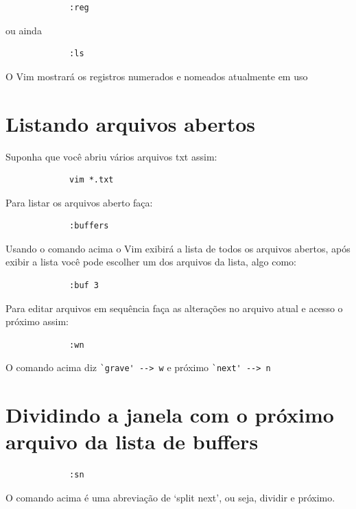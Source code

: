 \documentclass[10pt,a4paper,openany]{book}
\begin{document}
\begin{verbatim}
			 :reg
\end{verbatim}

ou ainda

\begin{verbatim}
			 :ls
\end{verbatim}

O Vim mostrará os registros numerados e nomeados atualmente em uso

\section{Listando arquivos abertos}
\label{Listando arquivos abertos}
Suponha que você abriu vários arquivos txt assim:

\begin{verbatim}
			 vim *.txt
\end{verbatim}

Para listar os arquivos aberto faça:

\begin{verbatim}
			 :buffers
\end{verbatim}

Usando o comando acima o Vim exibirá a lista de todos os arquivos
abertos, após exibir a lista você pode escolher um dos arquivos da
lista, algo como:

\begin{verbatim}
			 :buf 3
\end{verbatim}

Para editar arquivos em sequência faça as alterações no arquivo atual
e acesso o próximo assim:

\begin{verbatim}
			 :wn
\end{verbatim}

O comando acima diz \verb|`grave' --> w|  e próximo \verb|`next' --> n|

\section{Dividindo a janela com o próximo arquivo da lista de buffers}
\label{Dividindo a janela com o próximo arquivo da lista de buffers}

\begin{verbatim}
			 :sn
\end{verbatim}

O comando acima é uma abreviação de `split next', ou seja, dividir e próximo.
\end{document}
